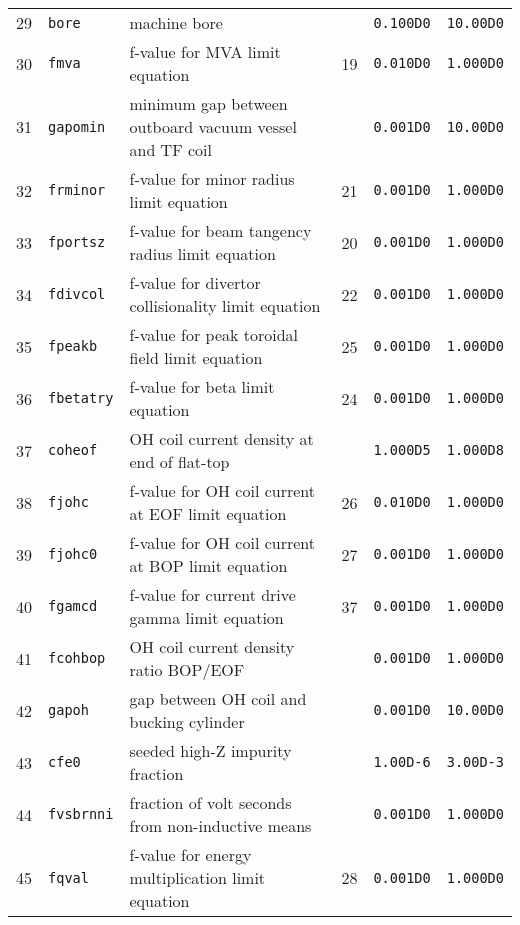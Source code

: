 \documentclass[11pt,a4paper]{report}
\begin{document}
\begin{table}[tbph]
\begin{center}
\begin{tabular}{||c|l|l|c|c|c||}
29  & \texttt{bore}     & machine bore                                  &     & \texttt{0.100D0} & \texttt{10.00D0} \\
30  & \texttt{fmva}     & f-value for MVA limit equation                & 19  & \texttt{0.010D0} & \texttt{1.000D0} \\
31  & \texttt{gapomin}  & minimum gap between outboard vacuum vessel and TF coil &     & \texttt{0.001D0} & \texttt{10.00D0} \\
32  & \texttt{frminor}  & f-value for minor radius limit equation       & 21  & \texttt{0.001D0} & \texttt{1.000D0} \\
33  & \texttt{fportsz}  & f-value for beam tangency radius limit equation & 20  & \texttt{0.001D0} & \texttt{1.000D0} \\
34  & \texttt{fdivcol}  & f-value for divertor collisionality limit equation & 22  & \texttt{0.001D0} & \texttt{1.000D0} \\
35  & \texttt{fpeakb}   & f-value for peak toroidal field limit equation & 25  & \texttt{0.001D0} & \texttt{1.000D0} \\
36  & \texttt{fbetatry} & f-value for beta limit equation               & 24  & \texttt{0.001D0} & \texttt{1.000D0} \\
37  & \texttt{coheof}   & OH coil current density at end of flat-top    &     & \texttt{1.000D5} & \texttt{1.000D8} \\
38  & \texttt{fjohc}    & f-value for OH coil current at EOF limit equation & 26  & \texttt{0.010D0} & \texttt{1.000D0} \\
39  & \texttt{fjohc0}   & f-value for OH coil current at BOP limit equation & 27  & \texttt{0.001D0} & \texttt{1.000D0} \\
40  & \texttt{fgamcd}   & f-value for current drive gamma limit equation & 37  & \texttt{0.001D0} & \texttt{1.000D0} \\
41  & \texttt{fcohbop}  & OH coil current density ratio BOP/EOF         &     & \texttt{0.001D0} & \texttt{1.000D0} \\
42  & \texttt{gapoh}    & gap between OH coil and bucking cylinder      &     & \texttt{0.001D0} & \texttt{10.00D0} \\
43  & \texttt{cfe0}     & seeded high-Z impurity fraction               &     & \texttt{1.00D-6} & \texttt{3.00D-3} \\
44  & \texttt{fvsbrnni} & fraction of volt seconds from non-inductive means &     & \texttt{0.001D0} & \texttt{1.000D0} \\
45  & \texttt{fqval}    & f-value for energy multiplication limit equation & 28  & \texttt{0.001D0} & \texttt{1.000D0} \\

\end{tabular}
\end{center}
\end{table}
\end{document}
